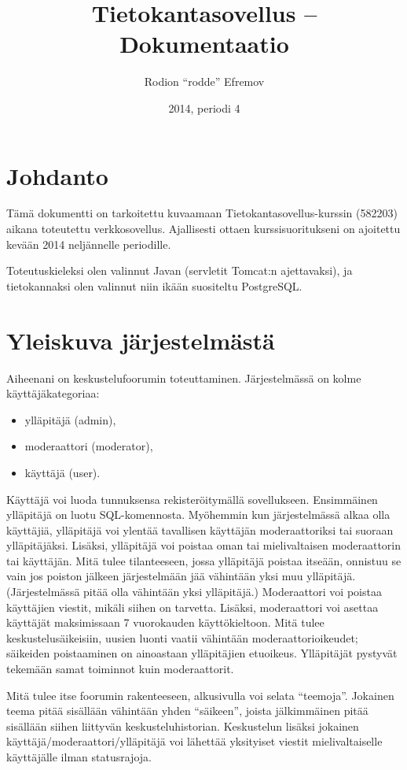\documentclass[10pt]{article}
\title{Tietokantasovellus -- Dokumentaatio}
\date{2014, periodi 4}
\author{Rodion ``rodde'' Efremov}
\begin{document}
\maketitle
\newpage
\tableofcontents
\newpage
{}

\section{Johdanto} Tämä dokumentti on tarkoitettu kuvaamaan Tietokantasovellus-kurssin (582203) aikana toteutettu verkkosovellus. Ajallisesti ottaen kurssisuoritukseni on ajoitettu kevään 2014 neljännelle periodille.

Toteutuskieleksi olen valinnut Javan (servletit Tomcat:n ajettavaksi), ja tietokannaksi olen valinnut niin ikään suositeltu PostgreSQL.

\section{Yleiskuva järjestelmästä}
Aiheenani on keskustelufoorumin toteuttaminen. Järjestelmässä on kolme käyttäjäkategoriaa: 
\begin{itemize}
  \item ylläpitäjä (admin),
  \item moderaattori (moderator),
  \item käyttäjä (user).
\end{itemize}
Käyttäjä voi luoda tunnuksensa rekisteröitymällä sovellukseen. Ensimmäinen ylläpitäjä on luotu SQL-komennosta. Myöhemmin kun järjestelmässä alkaa olla käyttäjiä, ylläpitäjä voi ylentää tavallisen käyttäjän moderaattoriksi tai suoraan ylläpitäjäksi. Lisäksi, ylläpitäjä voi poistaa oman tai mielivaltaisen moderaattorin tai käyttäjän. Mitä tulee tilanteeseen, jossa ylläpitäjä poistaa itseään, onnistuu se vain jos poiston jälkeen järjestelmään jää vähintään yksi muu ylläpitäjä. (Järjestelmässä pitää olla vähintään yksi ylläpitäjä.) Moderaattori voi poistaa käyttäjien viestit, mikäli siihen on tarvetta. Lisäksi, moderaattori voi asettaa käyttäjät maksimissaan 7 vuorokauden käyttökieltoon. Mitä tulee keskustelusäikeisiin, uusien luonti vaatii vähintään moderaattorioikeudet; säikeiden poistaaminen on ainoastaan ylläpitäjien etuoikeus. Ylläpitäjät pystyvät tekemään samat toiminnot kuin moderaattorit.

Mitä tulee itse foorumin rakenteeseen, alkusivulla voi selata ``teemoja''. Jokainen teema pitää sisällään vähintään yhden ``säikeen'', joista jälkimmäinen pitää sisällään siihen liittyvän keskusteluhistorian. Keskustelun lisäksi jokainen käyttäjä/moderaattori/ylläpitäjä voi lähettää yksityiset viestit mielivaltaiselle käyttäjälle ilman statusrajoja.
\end{document}
